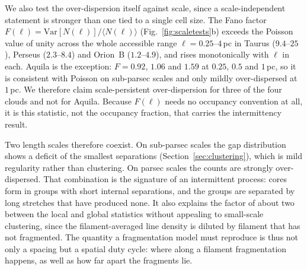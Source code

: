 \documentclass[usenatbib,twoside,twocolumn]{mnras}
\begin{document}
We also test the over-dispersion itself against scale, since a scale-independent statement is stronger than one tied to a single cell size. The Fano factor $F(\ell)=\mathrm{Var}[N(\ell)]/\langle N(\ell)\rangle$ (Fig.~\ref{fig:scaletests}b) exceeds the Poisson value of unity across the whole accessible range $\ell=0.25$--$4$\,pc in Taurus ($9.4$--$25$), Perseus ($2.3$--$8.4$) and Orion~B ($1.2$--$4.9$), and rises monotonically with $\ell$ in each. Aquila is the exception: $F=0.92$, $1.06$ and $1.59$ at $0.25$, $0.5$ and $1$\,pc, so it is consistent with Poisson on sub-parsec scales and only mildly over-dispersed at $1$\,pc. We therefore claim scale-persistent over-dispersion for three of the four clouds and not for Aquila. Because $F(\ell)$ needs no occupancy convention at all, it is this statistic, not the occupancy fraction, that carries the intermittency result.

Two length scales therefore coexist. On sub-parsec scales the gap distribution shows a deficit of the smallest separations (Section~\ref{sec:clustering}), which is mild regularity rather than clustering. On parsec scales the counts are strongly over-dispersed. That combination is the signature of an intermittent process: cores form in groups with short internal separations, and the groups are separated by long stretches that have produced none. It also explains the factor of about two between the local and global statistics without appealing to small-scale clustering, since the filament-averaged line density is diluted by filament that has not fragmented. The quantity a fragmentation model must reproduce is thus not only a spacing but a spatial duty cycle: where along a filament fragmentation happens, as well as how far apart the fragments lie.
\end{document}

